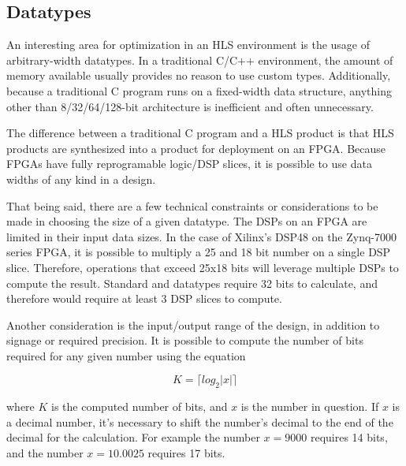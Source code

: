 \documentclass[11pt]{report}
\begin{document}
\begin{singlespace}
    
\end{singlespace}

\subsection{Datatypes}

An interesting area for optimization in an HLS environment is the usage of arbitrary-width datatypes. In a traditional C/C++ environment, the amount of memory available usually provides no reason to use custom types. Additionally, because a traditional C program runs on a fixed-width data structure, anything other than 8/32/64/128-bit architecture is inefficient and often unnecessary.

The difference between a traditional C program and a HLS product is that HLS products are synthesized into a product for deployment on an FPGA. Because FPGAs have fully reprogramable logic/DSP slices, it is possible to use data widths of any kind in a design.

That being said, there are a few technical constraints or considerations to be made in choosing the size of a given datatype. The DSPs on an FPGA are limited in their input data sizes. In the case of Xilinx's DSP48 on the Zynq-7000 series FPGA, it is possible to multiply a 25 and 18 bit number on a single DSP slice. Therefore, operations that exceed 25x18 bits will leverage multiple DSPs to compute the result. Standard  and  datatypes require 32 bits to calculate, and therefore would require at least 3 DSP slices to compute.

Another consideration is the input/output range of the design, in addition to signage or required precision. It is possible to compute the number of bits required for any given number using the equation

\begin{equation}\label{widthEQ}
	K = \lceil log_2{|x|} \rceil
\end{equation}

where $K$ is the computed number of bits, and $x$ is the number in question. If $x$ is a decimal number, it's necessary to shift the number's decimal to the end of the decimal for the calculation. For example the number $x = 9000$ requires 14 bits, and the number $x = 10.0025$ requires 17 bits.
\end{document}

